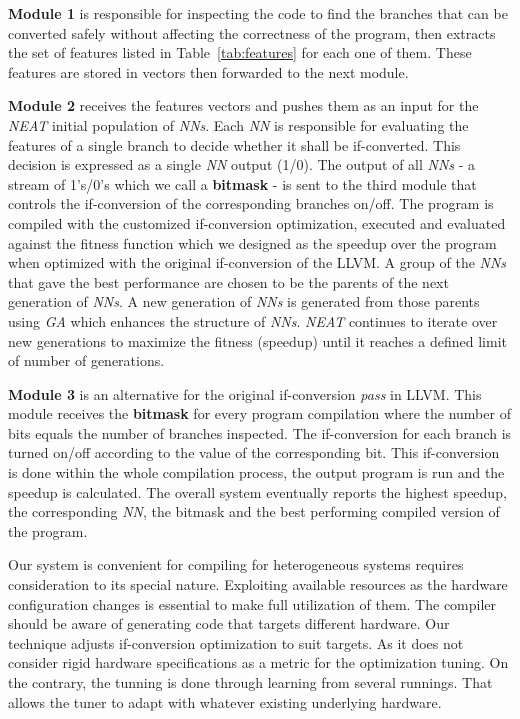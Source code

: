 \documentclass[preprint,nocopyrightspace]{sigplanconf}
\begin{document}
\textbf{Module 1} is responsible for inspecting the code to find the branches that can be converted safely without affecting the correctness of the program, then extracts the set of features listed in Table~\ref{tab:features} for each one of them. These features are stored in vectors then forwarded to the next module. 

\textbf{Module 2} receives the features vectors and pushes them as an input for the \textit{NEAT} initial population of \textit{NNs}. Each \textit{NN} is responsible for evaluating the features of a single branch to decide whether it shall be if-converted. This decision is expressed as a single \textit{NN} output (1/0). The output of all \textit{NNs} - a stream of 1's/0's which we call a \textbf{bitmask} - is sent to the third module that controls the if-conversion of the corresponding branches on/off. The program is compiled with the customized if-conversion optimization, executed and evaluated against the fitness function which we designed as the speedup over the program when optimized with the original if-conversion of the LLVM. A group of the \textit{NNs} that gave the best performance are chosen to be the parents of the next generation of \textit{NNs}. A new generation of \textit{NNs} is generated from those parents using \textit{GA} which enhances the structure of \textit{NNs}. \textit{NEAT} continues to iterate over new generations to maximize the fitness (speedup) until it reaches a defined limit of number of generations. 

\textbf{Module 3} is an alternative for the original if-conversion \textit{pass} in LLVM. This module receives the \textbf{bitmask} for every program compilation where the number of bits equals the number of branches inspected. The if-conversion for each branch is turned on/off according to the value of the corresponding bit. This if-conversion is done within the whole compilation process, the output program is run and the speedup is calculated. The overall system eventually reports the highest speedup, the corresponding \textit{NN}, the bitmask and the best performing compiled version of the program. 

Our system is convenient for compiling for heterogeneous systems requires consideration to its special nature. Exploiting available resources as the hardware configuration changes is essential to make full utilization of them. The compiler should be aware of generating code that  targets different hardware. Our technique adjusts if-conversion optimization to suit targets. As it does not consider rigid hardware specifications as a metric for the optimization tuning. On the contrary, the tunning is done through learning from several runnings. That allows the tuner to adapt with whatever existing underlying hardware.
\end{document}
